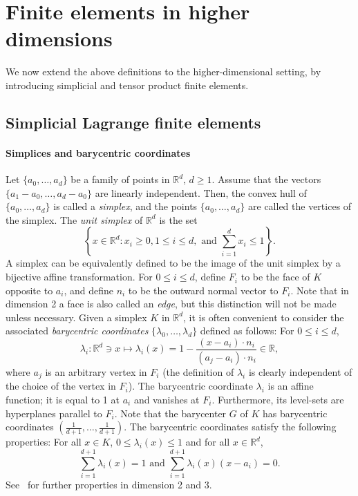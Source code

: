 \section{Finite elements in higher dimensions}\label{sec:finite-elements-high-dimensions}
We now extend the above definitions to the higher-dimensional setting, by introducing simplicial and tensor product finite elements.
\subsection{Simplicial Lagrange finite elements}
\paragraph{Simplices and barycentric coordinates} Let $\{a_0, \dots, a_d\}$ be a family of points in $\mathbb{R}^d$, $d \ge 1$. Assume that the vectors $\{a_1 - a_0, \dots, a_d - a_0\}$ are linearly independent. Then, the convex hull of $\{a_0, \dots, a_d\}$ is called a \emph{simplex}, and the points $\{a_0, \dots, a_d\}$ are called the vertices of the simplex. The \emph{unit simplex} of $\mathbb{R}^d$ is the set
\begin{equation}
    \left\{x \in \mathbb{R}^d: x_i \ge 0, 1 \le i \le d, \text{ and } \sum_{i=1}^d x_i \le 1 \right\}.
\end{equation}
A simplex can be equivalently defined to be the image of the unit simplex by a bijective affine transformation. For $0 \le i \le d$, define $F_i$ to be the face of $K$ opposite to $a_i$, and define $n_i$ to be the outward normal vector to $F_i$. Note that in dimension 2 a face is also called an \emph{edge}, but this distinction will not be made unless necessary.
Given a simplex $K$ in $\mathbb{R}^d$, it is often convenient to consider the associated \emph{barycentric coordinates} $\{\lambda_0, \dots, \lambda_d\}$ defined as follows: For $0 \le i \le d$,
\begin{equation}\label{eq:barycentric_coords}
    \lambda_i: \mathbb{R}^d \ni x \mapsto \lambda_i(x) = 1 - \frac{(x - a_i) \cdot n_i}{(a_j - a_i) \cdot n_i} \in \mathbb{R},
\end{equation}
where $a_j$ is an arbitrary vertex in $F_i$ (the definition of $\lambda_i$ is clearly independent of the choice of the vertex in $F_i$). The barycentric coordinate $\lambda_i$ is an affine function; it is equal to 1 at $a_i$ and vanishes at $F_i$. Furthermore, its level-sets are hyperplanes parallel to $F_i$. Note that the barycenter $G$ of $K$ has barycentric coordinates $(\frac{1}{d+1}, \dots, \frac{1}{d+1})$. The barycentric coordinates satisfy the following properties: For all $x \in K$, $0 \le \lambda_i(x) \le 1$ and for all $x \in \mathbb{R}^d$,
\begin{equation}
    \sum_{i=1}^{d+1} \lambda_i(x) = 1 \text{ and } \sum_{i=1}^{d+1} \lambda_i(x) (x - a_i) = 0.
\end{equation}
See~\cite[Exercise 1.4]{ern2004theory} for further properties in dimension 2 and 3.

